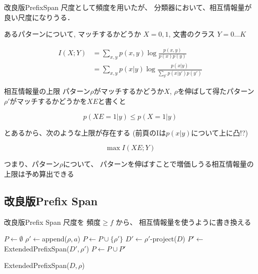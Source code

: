 \documentclass[12pt, dvipdfmx, default, cjk]{beamer}
\begin{document}
\def\given#1#2{p(#1\vert#2)}

\begin{frame}{改良版PrefixSpan}
  尺度として頻度を用いたが、
  分類器において、相互情報量が良い尺度になりうる．

  あるパターンについて,
  マッチするかどうか $X = 0, 1$,
  文書のクラス $Y = 0 \dots K$

  \begin{align*}
    I(X; Y) & = \sum_{x,y} p(x,y) \log \frac{p(x,y)}{p(x) p(y)} \\
    & = \sum_{x,y}
    \given x y
    \log
    \frac{\given x y}
    {
      \sum_{y'} \given{x}{y'} p(y')
    }
  \end{align*}

\end{frame}

\begin{frame}{相互情報量の上限}
  パターン$\rho$がマッチするかどうか$X$,
  $\rho$を伸ばして得たパターン$\rho'$がマッチするかどうかを$XE$と書くと

  \[ \given{XE=1}{y} \le \given{X=1}{y} \]

  とあるから、次のような上限が存在する
  (前頁のIは$\given x y $について上に凸!?)

  \[ \max I(XE; Y) \]

  つまり、パターン$\rho$について、
  パターンを伸ばすことで増価しうる相互情報量の上限は予め算出できる
\end{frame}

\subsection{改良版Prefix Span}
\begin{frame}{改良版Prefix Span}
  尺度を 頻度$\ge f$ から、
  相互情報量を使うように書き換える

  \begin{algorithm}[H]
    \begin{algorithmic}
      \STATE $P \leftarrow \emptyset$
      \STATE $\rho' \leftarrow $append($\rho, a$)
          \STATE $P \leftarrow P \cup \{\rho'\}$
          \STATE $D' \leftarrow \rho'$-project($D$)
          \STATE $P' \leftarrow $ExtendedPrefixSpan($D', \rho'$)
          \STATE $P \leftarrow P \cup P'$
        \ENDIF
      \ENDFOR
    \end{algorithmic}
    \caption{ExtendedPrefixSpan($D, \rho$)}
  \end{algorithm}

\end{frame}
\end{document}
